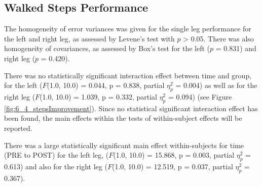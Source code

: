 \subsection{Walked Steps Performance}
The homogeneity of error variances was given for the single leg performance for the left and right leg, as assessed by Levene's test with $p$ > 0.05.
There was also homogeneity of covariances, as assessed by Box's test for the left ($p$ = 0.831) and right leg ($p$ = 0.420).

There was no statistically significant interaction effect between time and group, for the left ($F$(1.0, 10.0) = 0.044, p = 0.838, partial $\eta_{p}^{2}$ = 0.004) as well as for the right leg ($F$(1.0, 10.0) = 1.039, p = 0.332, partial $\eta_{p}^{2}$ = 0.094) (see Figure \ref{fig:6_4_stepsImprovement}).
Since no statistical significant interaction effect has been found, the main effects within the tests of within-subject effects will be reported.

There was a large statistically significant main effect within-subjects for time (PRE to POST) for the left leg, ($F$(1.0, 10.0) = 15.868, p = 0.003, partial $\eta_{p}^{2}$ = 0.613) and also for the right leg ($F$(1.0, 10.0) = 12.519, p = 0.037, partial $\eta_{p}^{2}$ = 0.367).


